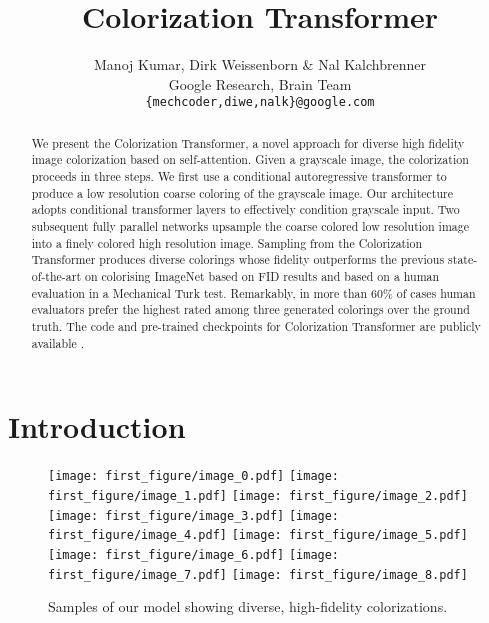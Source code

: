 \documentclass{article} \usepackage{iclr2021_conference,times}
\title{Colorization Transformer}
\author{Manoj Kumar, Dirk Weissenborn \& Nal Kalchbrenner \\
Google Research, Brain Team \\
\texttt{\{mechcoder,diwe,nalk\}@google.com} \\
}
\begin{document}
\maketitle

\begin{abstract}
We present the Colorization Transformer, a novel approach for diverse high fidelity image colorization based on self-attention. Given a grayscale image, the colorization proceeds in three steps. We first use a conditional autoregressive transformer to produce a low resolution coarse coloring of the grayscale image. Our architecture adopts conditional transformer layers to effectively condition grayscale input. Two subsequent fully parallel networks upsample the coarse colored low resolution image into a finely colored high resolution image. Sampling from the Colorization Transformer produces diverse colorings whose fidelity outperforms the previous state-of-the-art on colorising ImageNet based on FID results and based on a human evaluation in a Mechanical Turk test. Remarkably, in  more than 60\% of cases human evaluators prefer the highest rated among three generated colorings over the ground truth. The code and pre-trained checkpoints for Colorization Transformer are publicly available \href{https://github.com/google-research/google-research/tree/master/coltran}{\color{blue}{at this url}}.



\end{abstract}

\section{Introduction}
\begin{figure}[htp]
\setlength{\lineskip}{0pt}
  \centering
  \texttt{[image: first\_figure/image\_0.pdf]}
  \texttt{[image: first\_figure/image\_1.pdf]}
  \texttt{[image: first\_figure/image\_2.pdf]} \\
  \texttt{[image: first\_figure/image\_3.pdf]}
  \texttt{[image: first\_figure/image\_4.pdf]}
  \texttt{[image: first\_figure/image\_5.pdf]} \\
  \texttt{[image: first\_figure/image\_6.pdf]}
  \texttt{[image: first\_figure/image\_7.pdf]}
  \texttt{[image: first\_figure/image\_8.pdf]} \\
\caption{Samples of our model showing diverse, high-fidelity colorizations.}
\end{figure}
\end{document}
